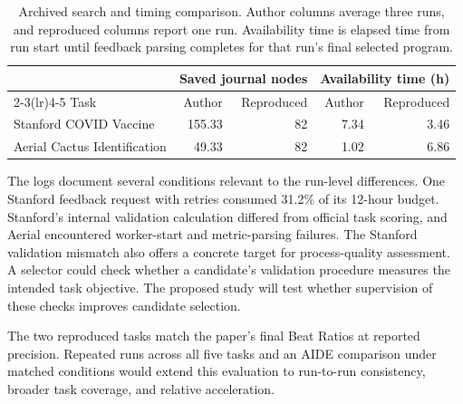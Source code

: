 \begin{table}[H]
\centering\small
\caption{Archived search and timing comparison. Author columns average three runs, and reproduced columns report one run. Availability time is elapsed time from run start until feedback parsing completes for that run's final selected program.}
\label{tab:repro-search}
\begin{tabular}{p{3.6cm}rrrr}
\toprule
 & \multicolumn{2}{c}{Saved journal nodes} & \multicolumn{2}{c}{Availability time (h)} \\
\cmidrule(lr){2-3}\cmidrule(lr){4-5}
Task & Author & Reproduced & Author & Reproduced \\
\midrule
Stanford COVID Vaccine & 155.33 & 82 & 7.34 & 3.46 \\
Aerial Cactus Identification & 49.33 & 82 & 1.02 & 6.86 \\
\bottomrule
\end{tabular}
\end{table}

The logs document several conditions relevant to the run-level differences. One Stanford feedback request with retries consumed 31.2\% of its 12-hour budget. Stanford's internal validation calculation differed from official task scoring, and Aerial encountered worker-start and metric-parsing failures. The Stanford validation mismatch also offers a concrete target for process-quality assessment. A selector could check whether a candidate's validation procedure measures the intended task objective. The proposed study will test whether supervision of these checks improves candidate selection.

The two reproduced tasks match the paper's final Beat Ratios at reported precision. Repeated runs across all five tasks and an AIDE comparison under matched conditions would extend this evaluation to run-to-run consistency, broader task coverage, and relative acceleration.
